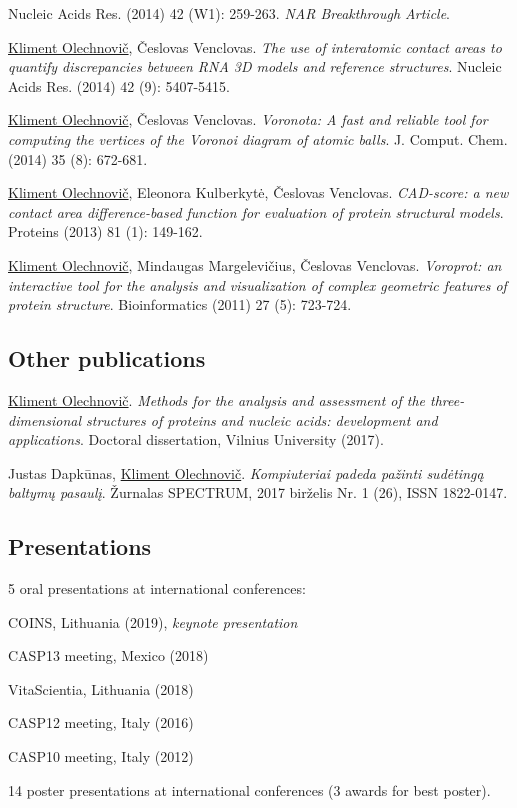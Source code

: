 \documentclass{article}
\newenvironment{enumerate_tight}{
\begin{enumerate}
  \setlength{\itemsep}{3pt}
  \setlength{\parskip}{0pt}
  \setlength{\parsep}{0pt}
}{\end{enumerate}}
\newenvironment{itemize_tight}{
\begin{itemize}
  \setlength{\itemsep}{3pt}
  \setlength{\parskip}{0pt}
  \setlength{\parsep}{0pt}
}{\end{itemize}}
\begin{document}
\begin{enumerate_tight}
        Nucleic Acids Res. (2014) 42 (W1): 259-263. \emph{NAR Breakthrough Article}.
  \item \underline{Kliment Olechnovič}, Česlovas Venclovas.
        \emph{The use of interatomic contact areas to quantify discrepancies between RNA 3D models and reference structures}.
        Nucleic Acids Res. (2014) 42 (9): 5407-5415.
  \item \underline{Kliment Olechnovič}, Česlovas Venclovas.
        \emph{Voronota: A fast and reliable tool for computing the vertices of the Voronoi diagram of atomic balls}.
        J. Comput. Chem. (2014) 35 (8): 672-681.
  \item \underline{Kliment Olechnovič}, Eleonora Kulberkytė, Česlovas Venclovas.
        \emph{CAD-score: a new contact area difference-based function for evaluation of protein structural models}.
        Proteins (2013) 81 (1): 149-162.
  \item \underline{Kliment Olechnovič}, Mindaugas Margelevičius, Česlovas Venclovas.
        \emph{Voroprot: an interactive tool for the analysis and visualization of complex geometric features of protein structure}.
        Bioinformatics (2011) 27 (5): 723-724.
\end{enumerate_tight}

\subsection*{Other publications}
\begin{itemize_tight}
  \item \underline{Kliment Olechnovič}.
        \emph{Methods for the analysis and assessment of the three-dimensional structures of proteins and nucleic acids: development and applications}.
        Doctoral dissertation, Vilnius University (2017).
  \item Justas Dapkūnas, \underline{Kliment Olechnovič}.
        \emph{Kompiuteriai padeda pažinti sudėtingą baltymų pasaulį}.
        Žurnalas SPECTRUM, 2017 birželis Nr. 1 (26), ISSN 1822-0147.
\end{itemize_tight}

\subsection*{Presentations}
\begin{itemize_tight}
  \item 5 oral presentations at international conferences:
    \begin{itemize_tight}
      \item COINS, Lithuania (2019), \emph{keynote presentation}
      \item CASP13 meeting, Mexico (2018)
      \item VitaScientia, Lithuania (2018)
      \item CASP12 meeting, Italy (2016)
      \item CASP10 meeting, Italy (2012)
    \end{itemize_tight}
  \item 14 poster presentations at international conferences (3 awards for best poster).
\end{itemize_tight}
\end{document}
